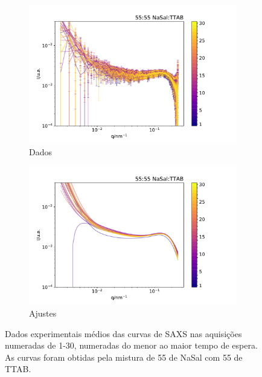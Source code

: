 	\begin{figure}[h]
		\begin{subfigure}[t]{0.5\textwidth}
			\centering
			\includegraphics[width=\textwidth]{imagens/saxs/TR_saxs_55_55_dados.pdf}
			\caption{Dados}
			\label{fig:saxs_tr_55_d}
		\end{subfigure}%
		\begin{subfigure}[t]{0.5\textwidth}
			\centering
			\includegraphics[width=\textwidth]{imagens/saxs/TR_saxs_55_55_ajuste.pdf}
			\caption{Ajustes}
			\label{fig:saxs_tr_55_a}
		\end{subfigure}
		\caption{Dados experimentais médios das curvas de SAXS nas aquisições numeradas de 1-30, numeradas do menor ao maior tempo de espera. As curvas foram obtidas pela mistura de 55 \mM{} de NaSal com 55\mM{} de TTAB.}
		\label{fig:saxs_tr_55}
	\end{figure} 


